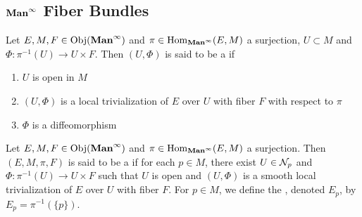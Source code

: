\documentclass{book}
\begin{document}
	\subsection{$\operatorname*{\text{\textbf{Man}}^{\infty}}$ Fiber Bundles}
	
	\begin{defn} 
		Let $E, M, F \in \operatorname{Obj}(\operatorname*{\text{\textbf{Man}}^{\infty}})$ and $\pi \in \operatorname{Hom}_{\operatorname*{\text{\textbf{Man}}^{\infty}}}(E, M)$ a surjection, $U \subset M$ and $\Phi: \pi^{-1}(U) \rightarrow U \times F$. Then $(U, \Phi)$ is said to be a   if 
		\begin{enumerate}
			\item $U$ is open in $M$
			\item $(U, \Phi)$ is a local trivialization of $E$ over $U$ with fiber $F$ with respect to $\pi$
			\item $\Phi$ is a diffeomorphism
		\end{enumerate}
	\end{defn}

	\begin{defn} 
		Let $E,M, F \in \operatorname{Obj}(\operatorname*{\text{\textbf{Man}}^{\infty}})$ and $\pi \in \operatorname{Hom}_{\operatorname*{\text{\textbf{Man}}^{\infty}}}(E, M)$ a surjection. Then $(E, M, \pi, F)$ is said to be a  if for each $p \in M$, there exist $U \in \mathcal{N}_p$ and $\Phi: \pi^{-1}(U) \rightarrow U \times F$ such that $U$ is open and $(U, \Phi)$ is a smooth local trivialization of $E$ over $U$ with fiber $F$. For $p \in M$, we define the , denoted $E_p$, by $E_p = \pi^{-1}(\{p\})$.
	\end{defn}
\end{document}

